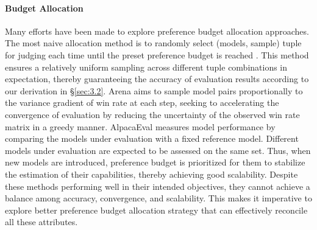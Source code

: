 \paragraph{Budget Allocation}
\label{sec:2.1}
Many efforts have been made to explore preference budget allocation approaches.
The most naive allocation method is to randomly select (models, sample) tuple for judging each time until the preset preference budget is reached \citep{allpair}. 
This method ensures a relatively uniform sampling across different tuple combinations in expectation, thereby guaranteeing the accuracy of evaluation results according to our derivation in \S\ref{sec:3.2}.
Arena \citep{arena} aims to sample model pairs proportionally to the variance gradient of win rate at each step, seeking to accelerating the convergence of evaluation by reducing the uncertainty of the observed win rate matrix in a greedy manner. 
AlpacaEval \citep{alpacaeval} measures model performance by comparing the models under evaluation with a fixed reference model. Different models under evaluation are expected to be assessed on the same set. Thus, when new models are introduced, preference budget is prioritized for them to stabilize the estimation of their capabilities, thereby achieving good scalability.
Despite these methods performing well in their intended objectives, they cannot achieve a balance among accuracy, convergence, and scalability. This makes it imperative to explore better preference budget allocation strategy that can effectively reconcile all these attributes.
